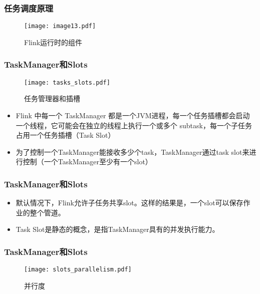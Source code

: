 \documentclass{beamer}
\begin{document}
  \begin{frame}
      \frametitle{任务调度原理}

      \begin{figure}
        \centering
        \texttt{[image: image13.pdf]}
        \caption{Flink运行时的组件}
      \end{figure}
  
  \end{frame}

  \begin{frame}
      \frametitle{TaskManager和Slots}

      \begin{figure}
        \centering
        \texttt{[image: tasks\_slots.pdf]}
        \caption{任务管理器和插槽}
      \end{figure}
  
      \begin{itemize}
          \item Flink 中每一个 TaskManager 都是一个JVM进程，每一个任务插槽都会启动一个线程，它可能会在独立的线程上执行一个或多个 subtask，每一个子任务占用一个任务插槽（Task Slot）
          \item 为了控制一个TaskManager能接收多少个task，TaskManager通过task slot来进行控制（一个TaskManager至少有一个slot）
      \end{itemize}
  
  \end{frame}

  \begin{frame}
      \frametitle{TaskManager和Slots}
  
      \begin{itemize}
          \item 默认情况下，Flink允许子任务共享slot。这样的结果是，一个slot可以保存作业的整个管道。
          \item Task Slot是静态的概念，是指TaskManager具有的并发执行能力。
      \end{itemize}
  
  \end{frame}

  \begin{frame}
      \frametitle{TaskManager和Slots}
  
      \begin{figure}
        \centering
        \texttt{[image: slots\_parallelism.pdf]}
        \caption{并行度}
      \end{figure}
  
  \end{frame}
\end{document}
